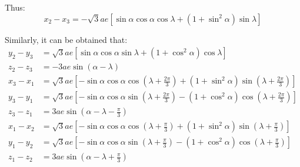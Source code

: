 \documentclass{article}
\begin{document}
	Thus:
	\begin{equation}
		x_2 - x_3 = -\sqrt{3}a e\left[\sin\alpha\cos\alpha\cos\lambda + (1 + \sin^2\alpha)\sin\lambda\right]
	\end{equation}
	
	Similarly, it can be obtained that:
	\begin{align}
		y_2 - y_3 &= \sqrt{3} a e \left[ \sin \alpha \cos \alpha \sin \lambda + (1 + \cos^2 \alpha) \cos \lambda \right] \\
		z_2 - z_3 &= -3 a e \sin(\alpha - \lambda) \\
		x_3 - x_1 &= \sqrt{3}a e\left[-\sin\alpha\cos\alpha\cos\left(\lambda + \frac{2\pi}{3}\right) + (1 + \sin^2\alpha)\sin\left(\lambda + \frac{2\pi}{3}\right)\right] \\
		y_3 - y_1 &= \sqrt{3}a e\left[-\sin\alpha\cos\alpha\sin\left(\lambda + \frac{2\pi}{3}\right) - (1 + \cos^2\alpha)\cos\left(\lambda + \frac{2\pi}{3}\right)\right] \\
		z_3 - z_1 &= 3a e\sin\left(\alpha - \lambda - \frac{\pi}{3}\right) \\
		x_1 - x_2 &= \sqrt{3}a e\left[-\sin\alpha\cos\alpha\cos\left(\lambda + \frac{\pi}{3}\right) + (1 + \sin^2\alpha)\sin\left(\lambda + \frac{\pi}{3}\right)\right] \\
		y_1 - y_2 &= \sqrt{3}a e\left[-\sin\alpha\cos\alpha\sin\left(\lambda + \frac{\pi}{3}\right) - (1 + \cos^2\alpha)\cos\left(\lambda + \frac{\pi}{3}\right)\right] \\
		z_1 - z_2 &= 3a e\sin\left(\alpha - \lambda + \frac{\pi}{3}\right) 
	\end{align}
	
\end{document}
